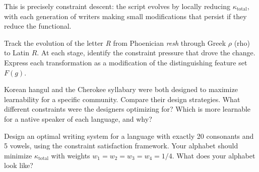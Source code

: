 This is precisely constraint descent: the script evolves by locally
reducing $\kappa_\text{total}$, with each generation of writers
making small modifications that persist if they reduce the functional.

\begin{exercise}
  Track the evolution of the letter \textit{R} from Phoenician
  \textit{resh} through Greek $\rho$ (rho) to Latin $R$.
  At each stage, identify the constraint pressure that drove the change.
  Express each transformation as a modification of the distinguishing
  feature set $F(g)$.
\end{exercise}

\begin{exercise}
  Korean hangul and the Cherokee syllabary were both designed to
  maximize learnability for a specific community. Compare their
  design strategies. What different constraints were the designers
  optimizing for? Which is more learnable for a native speaker of each
  language, and why?
\end{exercise}

\begin{exercise}[title={Design}]
  Design an optimal writing system for a language with exactly 20
  consonants and 5 vowels, using the constraint satisfaction framework.
  Your alphabet should minimize $\kappa_\text{total}$ with weights
  $w_1 = w_2 = w_3 = w_4 = 1/4$. What does your alphabet look like?
\end{exercise}
